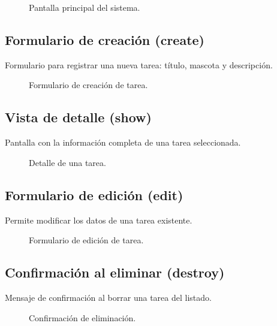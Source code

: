 \documentclass[11pt,a4paper]{article}
\begin{document}
\begin{figure}[H]
    \centering
    \caption{Pantalla principal del sistema.}
\end{figure}

\subsection{Formulario de creación (create)}
Formulario para registrar una nueva tarea: título, mascota y descripción.

\begin{figure}[H]
    \centering
    \caption{Formulario de creación de tarea.}
\end{figure}

\subsection{Vista de detalle (show)}
Pantalla con la información completa de una tarea seleccionada.

\begin{figure}[H]
    \centering
    \caption{Detalle de una tarea.}
\end{figure}

\subsection{Formulario de edición (edit)}
Permite modificar los datos de una tarea existente.

\begin{figure}[H]
    \centering
    \caption{Formulario de edición de tarea.}
\end{figure}

\subsection{Confirmación al eliminar (destroy)}
Mensaje de confirmación al borrar una tarea del listado.

\begin{figure}[H]
    \centering
    \caption{Confirmación de eliminación.}
\end{figure}
\end{document}
